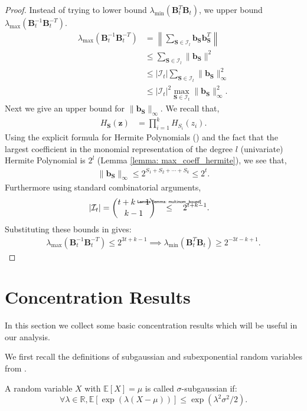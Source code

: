 \documentclass[final,12pt]{colt2018} %
\newcommand{\E}{\mathbb{E}}
\newcommand{\R}{\mathbb{R}}
\newcommand{\explain}[2]{\mathrel{\overset{\makebox[0pt]{\mbox{\normalfont\tiny\sffamily #1}}}{#2}}}
\renewcommand\v[1]{{\ensuremath{\boldsymbol{#1}}}}
\newcommand{\lambdamin}[1]{\lambda_{\text{min}} \left( #1 \right)}
\newcommand{\lambdamax}[1]{\lambda_{\text{max}} \left( #1 \right)}
\begin{document}
\begin{proof}
Instead of trying to lower bound $\lambdamin{\v B_t^T \v B_t}$, we upper bound $\lambdamax{\v B_t^{-1} \v B_t^{-T}}$.
\begin{align}
    \lambdamax{\v B_t^{-1}\v B_t^{-T}} & = \left\| \sum_{{\v S} \in \mathcal{I}_l} \v b_{\v S} \v b_{\v S}^T \right\| \nonumber \\
    & \leq \sum_{{\v S} \in \mathcal{I}_l}\| \v b_{\v S}\|^2 \nonumber \\
    & \leq | \mathcal{I}_t | \sum_{{\v S} \in \mathcal{I}_t} \| \v b_{\v S} \|_\infty^2 \nonumber \\
    & \leq |\mathcal{I}_t |^2 \max_{{\v S} \in \mathcal{I}_t} \| \v b_{\v S} \|_\infty^2. \label{eq: cond_number_eq1}
\end{align}
Next we give an upper bound for $\| \v b_{\v S}\|_\infty$. We recall that,
\begin{align*}
    H_{\v S}(\v z) & = \prod_{i=1}^k H_{S_i}(z_i).
\end{align*}
Using the explicit formula for Hermite Polynomials () and the fact that the largest coefficient in the monomial representation of the degree $l$ (univariate) Hermite Polynomial is $2^l$ (Lemma \ref{lemma: max_coeff_hermite}), we see that,
\begin{align*}
    \| \v b_{\v S} \|_\infty \leq 2^{S_1 + S_2 + \dotsb + S_k} \leq 2^t.
\end{align*}
Furthermore using standard combinatorial arguments,
\begin{align*}
    | \mathcal{I}_t | & = \binom{t+k-1}{k-1} \quad \explain{Lemma \ref{lemma: multinom_bound}}{\leq} \quad 2^{t+k-1}.
\end{align*}
Substituting these bounds in  gives:
\begin{align*}
    \lambdamax{\v B_t^{-1} \v B_t^{-T}} \leq 2^{3t + k -1} \implies \lambdamin{\v B_t^T \v B_t} \geq 2^{-3t-k+1}.
\end{align*}
\end{proof}



\section{Concentration Results}
In this section we collect some basic concentration results which will be useful in our analysis.

We first recall the definitions of subgaussian and subexponential random variables from \cite{wainwright2015basic}. 
\begin{definition} A random variable $X$ with $\E[X] = \mu$ is called $\sigma$-subgaussian if:
$$\forall \lambda \in \R, \E[\exp(\lambda (X-\mu))] \leq \exp(\lambda^2 \sigma^2/2).$$
\label{def: subgauss_def}
\end{definition}
\end{document}

